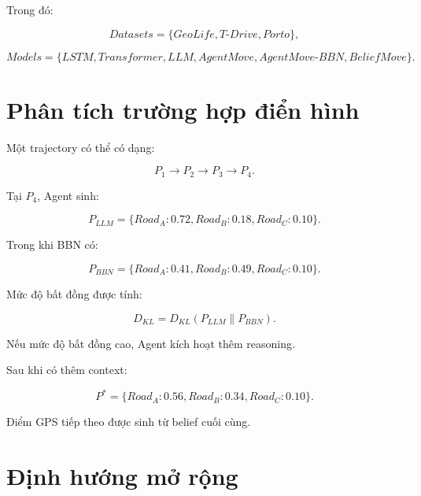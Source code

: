 \documentclass[11pt,a4paper]{article}
\begin{document}
	Trong đó:
	
	\begin{equation}
		Datasets
		=
		\{
		GeoLife,
		T\text{-}Drive,
		Porto
		\},
	\end{equation}
	
	\begin{equation}
		Models
		=
		\{
		LSTM,
		Transformer,
		LLM,
		AgentMove,
		AgentMove\text{-}BBN,
		BeliefMove
		\}.
	\end{equation}
	
	\section{Phân tích trường hợp điển hình}
	
	Một trajectory có thể có dạng:
	
	\begin{equation}
		P_1
		\rightarrow
		P_2
		\rightarrow
		P_3
		\rightarrow
		P_4.
	\end{equation}
	
	Tại $P_4$, Agent sinh:
	
	\begin{equation}
		P_{LLM}
		=
		\{
		Road_A:0.72,
		Road_B:0.18,
		Road_C:0.10
		\}.
	\end{equation}
	
	Trong khi BBN có:
	
	\begin{equation}
		P_{BBN}
		=
		\{
		Road_A:0.41,
		Road_B:0.49,
		Road_C:0.10
		\}.
	\end{equation}
	
	Mức độ bất đồng được tính:
	
	\begin{equation}
		D_{KL}
		=
		D_{KL}
		(
		P_{LLM}
		\|
		P_{BBN}
		).
	\end{equation}
	
	Nếu mức độ bất đồng cao, Agent kích hoạt thêm reasoning.
	
	Sau khi có thêm context:
	
	\begin{equation}
		P^*
		=
		\{
		Road_A:0.56,
		Road_B:0.34,
		Road_C:0.10
		\}.
	\end{equation}
	
	Điểm GPS tiếp theo được sinh từ belief cuối cùng.
	
	\section{Định hướng mở rộng}
	
\end{document}
